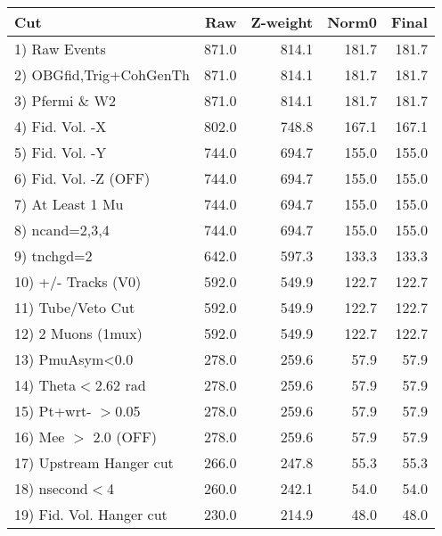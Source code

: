  \begin{table}[h!]\centering
 \begin{tabular}{||l||r|r|r|r||}
 \hline
 \hline
 Cut & Raw & Z-weight & Norm0 & Final \\
 \hline
  1) Raw Events           &       871.0 &       814.1 &       181.7 &       181.7 \\
  2) OBGfid,Trig+CohGenTh &       871.0 &       814.1 &       181.7 &       181.7 \\
  3) Pfermi \& W2         &       871.0 &       814.1 &       181.7 &       181.7 \\
  4) Fid. Vol. -X         &       802.0 &       748.8 &       167.1 &       167.1 \\
  5) Fid. Vol. -Y         &       744.0 &       694.7 &       155.0 &       155.0 \\
  6) Fid. Vol. -Z (OFF)   &       744.0 &       694.7 &       155.0 &       155.0 \\
  7) At Least 1 Mu        &       744.0 &       694.7 &       155.0 &       155.0 \\
  8) ncand=2,3,4          &       744.0 &       694.7 &       155.0 &       155.0 \\
  9) tnchgd=2             &       642.0 &       597.3 &       133.3 &       133.3 \\
 10) +/- Tracks (V0)      &       592.0 &       549.9 &       122.7 &       122.7 \\
 11) Tube/Veto Cut        &       592.0 &       549.9 &       122.7 &       122.7 \\
 12) 2 Muons (1mux)       &       592.0 &       549.9 &       122.7 &       122.7 \\
 13) PmuAsym<0.0          &       278.0 &       259.6 &        57.9 &        57.9 \\
 14) Theta$<$2.62 rad     &       278.0 &       259.6 &        57.9 &        57.9 \\
 15) Pt+wrt- $>$0.05      &       278.0 &       259.6 &        57.9 &        57.9 \\
 16) Mee $>$ 2.0  (OFF)   &       278.0 &       259.6 &        57.9 &        57.9 \\
 17) Upstream Hanger cut  &       266.0 &       247.8 &        55.3 &        55.3 \\
 18) nsecond$<$4          &       260.0 &       242.1 &        54.0 &        54.0 \\
 19) Fid. Vol. Hanger cut &       230.0 &       214.9 &        48.0 &        48.0 \\

\end{tabular}
\end{table}

